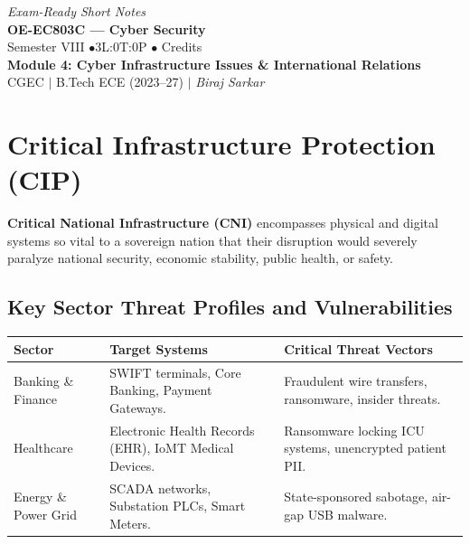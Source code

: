 \documentclass[12pt,a4paper]{article}
\renewcommand{\arraystretch}{1.45}
\begin{document}
\begin{center}
  \hfill \textit{Exam-Ready Short Notes} \\
  \vspace{6pt}
  {\LARGE\bfseries\color{myred} OE-EC803C --- Cyber Security}\\[5pt]
  {\normalsize\color{mydark} Semester VIII \quad$\bullet$\quad 3L:0T:0P \quad$\bullet$ Credits}\\[3pt]
  {\normalsize\color{myteal}\textbf{Module 4: Cyber Infrastructure Issues \& International Relations}}\\[3pt]
  {\small\color{mydark} CGEC \;$|$\; B.Tech ECE (2023--27) \;$|$\; \textit{Biraj Sarkar}}
\end{center}
\vspace{2pt}
\noindent{\color{myred}\rule{\linewidth}{1.5pt}}
\vspace{2pt}

\hypersetup{linkcolor=mydark}
\tableofcontents
\hypersetup{linkcolor=myteal}
\newpage

\section{Critical Infrastructure Protection (CIP)}

\begin{tcolorbox}[defbox, title={\textbf{Definition: Critical National Infrastructure (CNI)}}]
\textbf{Critical National Infrastructure (CNI)} encompasses physical and digital systems so vital to a sovereign nation that their disruption would severely paralyze national security, economic stability, public health, or safety.
\end{tcolorbox}

\subsection{Key Sector Threat Profiles and Vulnerabilities}
{\renewcommand{\arraystretch}{1.45}%
\begin{tabularx}{\linewidth}{|B{3.5cm}|Y|Y|}
\hline
\textbf{Sector} & \textbf{Target Systems} & \textbf{Critical Threat Vectors} \\
\hline
Banking \& Finance & SWIFT terminals, Core Banking, Payment Gateways. & Fraudulent wire transfers, ransomware, insider threats. \\
\hline
Healthcare & Electronic Health Records (EHR), IoMT Medical Devices. & Ransomware locking ICU systems, unencrypted patient PII. \\
\hline
Energy \& Power Grid & SCADA networks, Substation PLCs, Smart Meters. & State-sponsored sabotage, air-gap USB malware. \\
\hline
\end{tabularx}}
\end{document}
